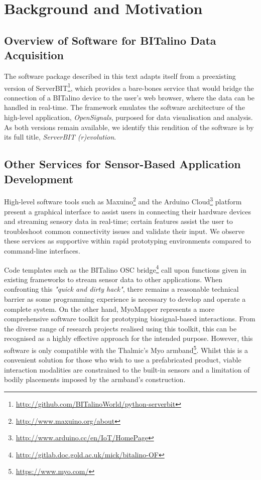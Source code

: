 \section{Background and Motivation}

\subsection{Overview of Software for BITalino Data Acquisition}
The software package described in this text adapts itself from a preexisting version of ServerBIT\footnote{\url{http://github.com/BITalinoWorld/python-serverbit}}, which provides a bare-bones service that would bridge the connection of a BITalino device to the user’s web browser, where the data can be handled in real-time. The framework emulates the software architecture of the high-level application, \textit{OpenSignals}, purposed for data visualisation and analysis. As both versions remain available, we identify this rendition of the software is by its full title, \textit{ServerBIT (r)evolution}.

\subsection{Other Services for Sensor-Based Application Development} \label{services}
High-level software tools such as Maxuino\footnote[2]{\url{http://www.maxuino.org/about}} and the Arduino Cloud\footnote[3]{\url{http://www.arduino.cc/en/IoT/HomePage}} platform present a graphical interface to assist users in connecting their hardware devices and streaming sensory data in real-time; certain features assist the user to troubleshoot common connectivity issues and validate their input. We observe these services as supportive within rapid prototyping environments compared to command-line interfaces.

Code templates such as the BITalino OSC bridge\footnote[4]{\url{http://gitlab.doc.gold.ac.uk/mick/bitalino-OF}} call upon functions given in existing frameworks to stream sensor data to other applications. When confronting this \textit{"quick and dirty hack"}, there remains a reasonable technical barrier as some programming experience is necessary to develop and operate a complete system. On the other hand, MyoMapper\cite{donato_myo_nodate}  represents a more comprehensive software toolkit for prototyping biosignal-based interactions. From the diverse range of research projects realised using this toolkit\cite{brown_simple_2018,bullock_approaches_2016,di_donato_accessible_2019}, this can be recognised as a highly effective approach for the intended purpose. However, this software is only compatible with the Thalmic's Myo armband\footnote{\url{https://www.myo.com/}}. Whilst this is a convenient solution for those who wish to use a prefabricated product, viable interaction modalities are constrained to the built-in sensors and a limitation of bodily placements imposed by the armband's construction.

